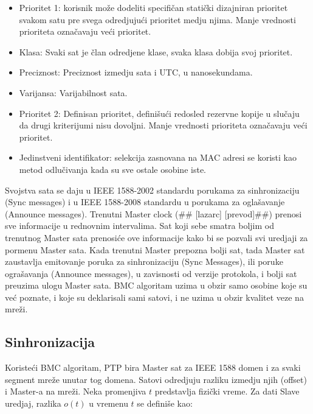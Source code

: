 \documentclass[a4paper,12pt, master]{etf}
\begin{document}
    \begin{itemize}
        \item Prioritet 1: korisnik mo\v{z}e dodeliti specifi\v{c}an stati\v{c}ki dizajniran prioritet 
        svakom satu pre	svega odredjuju\'{c}i prioritet medju njima. Manje vrednosti prioriteta 
        ozna\v{c}avaju ve\'{c}i prioritet.
	    \item Klasa: Svaki sat je \v{c}lan odredjene klase, svaka klasa dobija svoj prioritet.
	    \item Preciznost: Preciznost izmedju sata i UTC, u nanosekundama.
	    \item Varijansa: Varijabilnost sata.
        \item Prioritet 2: Definisan prioritet, defini\v{s}u\'{c}i redosled rezervne kopije u slu\v{c}aju 
        da drugi kriterijumi nisu dovoljni. Manje vrednosti prioriteta ozna\v{c}avaju ve\'{c}i prioritet.
	    \item Jedinstveni identifikator: selekcija zasnovana na MAC adresi se koristi kao metod 
	    odlu\v{c}ivanja	kada su sve ostale osobine iste.
    \end{itemize}

    Svojstva sata se daju u IEEE 1588-2002 standardu porukama za sinhronizaciju (Sync messages) i u 
    IEEE 1588-2008 standardu u porukama za ogla\v{s}avanje (Announce messages). Trenutni Master clock (\#\#
	[lazarc] [prevod]\#\#) prenosi sve informacije u rednovnim intervalima. Sat koji sebe 
	smatra boljim od trenutnog Master sata prenosi\'{c}e ove informacije kako bi se pozvali svi 
	uredjaji za pormenu	Master sata. Kada trenutni Master prepozna bolji sat, tada Master sat 
	zaustavlja emitovanje poruka za sinhronizaciju (Sync Messages), ili poruke ogra\v{s}avanja 
	(Announce messages), u zavisnosti od verzije protokola, i bolji sat preuzima ulogu Master 
	sata. BMC algoritam uzima u obzir samo osobine koje su ve\'{c} poznate, i koje su deklarisali 
	sami satovi, i ne uzima u obzir	kvalitet veze na mre\v{z}i.

	\subsection{Sinhronizacija}

	Koriste\'{c}i BMC algoritam, PTP bira Master sat za IEEE 1588 domen i za svaki segment mre\v{z}e 
    unutar tog domena. Satovi odredjuju razliku izmedju njih (offset) i Master-a na mre\v{z}i. Neka 
    promenjiva $t$ predstavlja fizi\v{c}ki vreme. Za dati Slave uredjaj, razlika $o(t)$ u vremenu $t$ 
    se defini\v{s}e kao:
\end{document}
